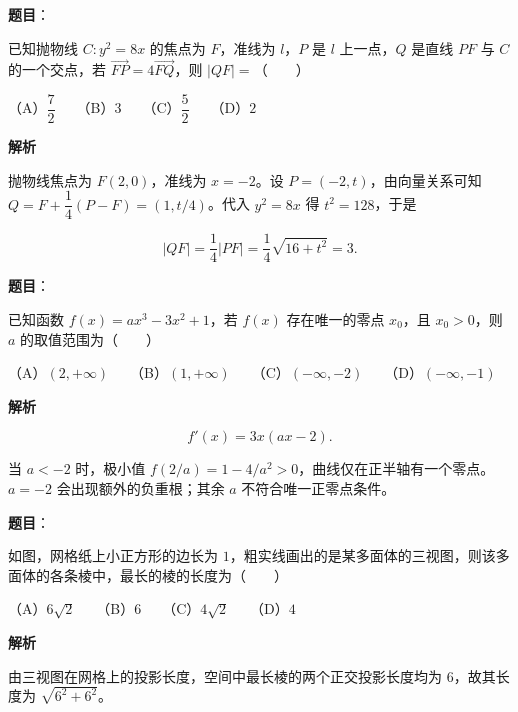 \begin{answer}

\textbf{题目}：

已知抛物线 $C:y^2=8x$ 的焦点为 $F$，准线为 $l$，$P$ 是 $l$ 上一点，$Q$ 是直线 $PF$ 与 $C$ 的一个交点，若 $\overrightarrow{FP}=4\overrightarrow{FQ}$，则 $|QF|=$\mbox{（　　）}

（A）$\dfrac72$　　（B）$3$　　（C）$\dfrac52$　　（D）$2$

\textbf{解析}

抛物线焦点为 $F(2,0)$，准线为 $x=-2$。设 $P=(-2,t)$，由向量关系可知 $Q=F+\dfrac14(P-F)=(1,t/4)$。代入 $y^2=8x$ 得 $t^2=128$，于是

\nopagebreak[4]
\[
|QF|=\frac14|PF|=\frac14\sqrt{16+t^2}=3.
\]


\end{answer}
\begin{answer}

\textbf{题目}：

已知函数 $f(x)=ax^3-3x^2+1$，若 $f(x)$ 存在唯一的零点 $x_0$，且 $x_0>0$，则 $a$ 的取值范围为\mbox{（　　）}

（A）$(2,+\infty)$　　（B）$(1,+\infty)$　　（C）$(-\infty,-2)$　　（D）$(-\infty,-1)$

\textbf{解析}

\nopagebreak[4]
\[
f'(x)=3x(ax-2).
\]

当 $a<-2$ 时，极小值 $f(2/a)=1-4/a^2>0$，曲线仅在正半轴有一个零点。$a=-2$ 会出现额外的负重根；其余 $a$ 不符合唯一正零点条件。


\end{answer}
\begin{answer}

\textbf{题目}：

如图，网格纸上小正方形的边长为 $1$，粗实线画出的是某多面体的三视图，则该多面体的各条棱中，最长的棱的长度为\mbox{（　　）}
\nopagebreak[4]
\begin{center}\end{center}
\nopagebreak[4]
（A）$6\sqrt2$　　（B）$6$　　（C）$4\sqrt2$　　（D）$4$

\textbf{解析}

由三视图在网格上的投影长度，空间中最长棱的两个正交投影长度均为 $6$，故其长度为 $\sqrt{6^2+6^2}$。


\end{answer}

